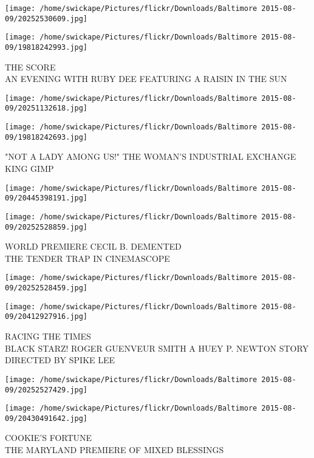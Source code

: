 \documentclass[10pt,letterpaper]{article}
\begin{document}
\texttt{[image: /home/swickape/Pictures/flickr/Downloads/Baltimore 2015-08-09/20252530609.jpg]}

\vspace{0.25in}
\texttt{[image: /home/swickape/Pictures/flickr/Downloads/Baltimore 2015-08-09/19818242993.jpg]}

THE SCORE\\
AN EVENING WITH RUBY DEE FEATURING A RAISIN IN THE SUN
\pagebreak

\texttt{[image: /home/swickape/Pictures/flickr/Downloads/Baltimore 2015-08-09/20251132618.jpg]}

\vspace{0.25in}
\texttt{[image: /home/swickape/Pictures/flickr/Downloads/Baltimore 2015-08-09/19818242693.jpg]}

"NOT A LADY AMONG US!" THE WOMAN'S INDUSTRIAL EXCHANGE\\
KING GIMP
\pagebreak

\texttt{[image: /home/swickape/Pictures/flickr/Downloads/Baltimore 2015-08-09/20445398191.jpg]}

\vspace{0.25in}
\texttt{[image: /home/swickape/Pictures/flickr/Downloads/Baltimore 2015-08-09/20252528859.jpg]}

WORLD PREMIERE CECIL B. DEMENTED\\
THE TENDER TRAP IN CINEMASCOPE
\pagebreak

\texttt{[image: /home/swickape/Pictures/flickr/Downloads/Baltimore 2015-08-09/20252528459.jpg]}

\vspace{0.25in}
\texttt{[image: /home/swickape/Pictures/flickr/Downloads/Baltimore 2015-08-09/20412927916.jpg]}

RACING THE TIMES\\
BLACK STARZ!  ROGER GUENVEUR SMITH A HUEY P. NEWTON STORY DIRECTED BY SPIKE LEE
\pagebreak

\texttt{[image: /home/swickape/Pictures/flickr/Downloads/Baltimore 2015-08-09/20252527429.jpg]}

\vspace{0.25in}
\texttt{[image: /home/swickape/Pictures/flickr/Downloads/Baltimore 2015-08-09/20430491642.jpg]}

COOKIE'S FORTUNE\\
THE MARYLAND PREMIERE OF MIXED BLESSINGS
\pagebreak
\end{document}
